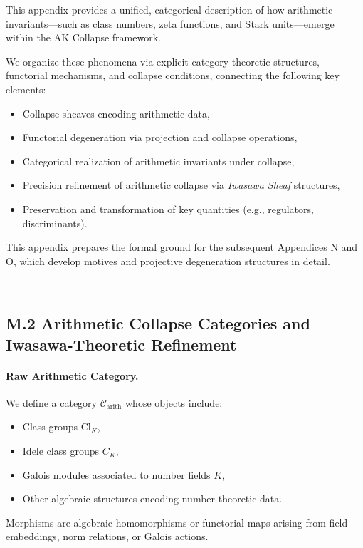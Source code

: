 \documentclass[11pt]{article}
\begin{document}
This appendix provides a unified, categorical description of how arithmetic invariants—such as class numbers, zeta functions, and Stark units—emerge within the AK Collapse framework.  

We organize these phenomena via explicit category-theoretic structures, functorial mechanisms, and collapse conditions, connecting the following key elements:
\begin{itemize}
  \item Collapse sheaves encoding arithmetic data,
  \item Functorial degeneration via projection and collapse operations,
  \item Categorical realization of arithmetic invariants under collapse,
  \item Precision refinement of arithmetic collapse via \emph{Iwasawa Sheaf} structures,
  \item Preservation and transformation of key quantities (e.g., regulators, discriminants).
\end{itemize}

This appendix prepares the formal ground for the subsequent Appendices N and O, which develop motives and projective degeneration structures in detail.

---

\subsection*{M.2 Arithmetic Collapse Categories and Iwasawa-Theoretic Refinement}

\paragraph{Raw Arithmetic Category.}
We define a category \( \mathcal{C}_{\mathrm{arith}} \) whose objects include:
\begin{itemize}
  \item Class groups \( \mathrm{Cl}_K \),
  \item Idele class groups \( C_K \),
  \item Galois modules associated to number fields \( K \),
  \item Other algebraic structures encoding number-theoretic data.
\end{itemize}

Morphisms are algebraic homomorphisms or functorial maps arising from field embeddings, norm relations, or Galois actions.
\end{document}
